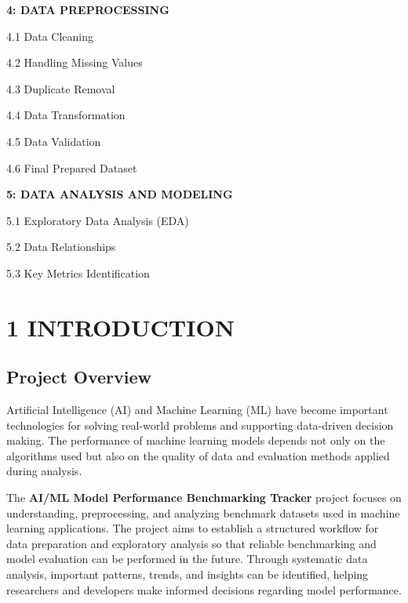 \documentclass[12pt,a4paper]{report}
\begin{document}
\vspace{0.3cm}

\textbf{4: DATA PREPROCESSING} \dotfill

4.1 Data Cleaning \dotfill

4.2 Handling Missing Values \dotfill

4.3 Duplicate Removal \dotfill

4.4 Data Transformation \dotfill

4.5 Data Validation \dotfill

4.6 Final Prepared Dataset \dotfill

\vspace{0.3cm}

\textbf{5: DATA ANALYSIS AND MODELING} \dotfill

5.1 Exploratory Data Analysis (EDA) \dotfill

5.2 Data Relationships \dotfill

5.3 Key Metrics Identification \dotfill

\newpage

\chapter*{\color{ChapterBlue}1 INTRODUCTION}

\setcounter{chapter}{1}
\setcounter{section}{0}

\section{Project Overview}

Artificial Intelligence (AI) and Machine Learning (ML) have become important technologies for solving real-world problems and supporting data-driven decision making. The performance of machine learning models depends not only on the algorithms used but also on the quality of data and evaluation methods applied during analysis.

The \textbf{AI/ML Model Performance Benchmarking Tracker} project focuses on understanding, preprocessing, and analyzing benchmark datasets used in machine learning applications. The project aims to establish a structured workflow for data preparation and exploratory analysis so that reliable benchmarking and model evaluation can be performed in the future. Through systematic data analysis, important patterns, trends, and insights can be identified, helping researchers and developers make informed decisions regarding model performance.
\end{document}

